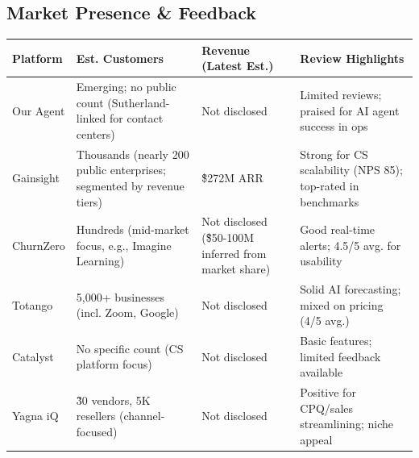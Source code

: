 \documentclass[12pt,a4paper]{article}
\begin{document}
\subsection{Market Presence \& Feedback}
\footnotesize
\setlength{\tabcolsep}{3pt}
\renewcommand{\arraystretch}{1.2}
\begin{longtable}{|p{2.5cm}|p{4.5cm}|p{3.5cm}|p{4.5cm}|}
\hline
\textbf{Platform} & \textbf{Est. Customers} & \textbf{Revenue (Latest Est.)} & \textbf{Review Highlights} \\
\hline
Our Agent & Emerging; no public count (Sutherland-linked for contact centers) & Not disclosed & Limited reviews; praised for AI agent success in ops \\
\hline
Gainsight & Thousands (nearly 200 public enterprises; segmented by revenue tiers) & \~\$272M ARR & Strong for CS scalability (NPS 85); top-rated in benchmarks \\
\hline
ChurnZero & Hundreds (mid-market focus, e.g., Imagine Learning) & Not disclosed (\~\$50-100M inferred from market share) & Good real-time alerts; 4.5/5 avg. for usability \\
\hline
Totango & 5,000+ businesses (incl. Zoom, Google) & Not disclosed & Solid AI forecasting; mixed on pricing (4/5 avg.) \\
\hline
Catalyst & No specific count (CS platform focus) & Not disclosed & Basic features; limited feedback available \\
\hline
Yagna iQ & \~30 vendors, 5K resellers (channel-focused) & Not disclosed & Positive for CPQ/sales streamlining; niche appeal \\
\hline
\end{longtable}
\normalsize
\end{document}
